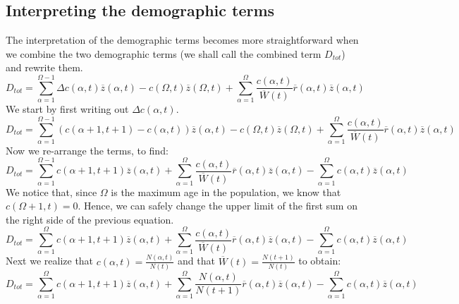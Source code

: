 \subsection{Interpreting the demographic terms}\label{app:ape:demo}
The interpretation of the demographic terms becomes more straightforward when we combine the two demographic terms (we shall call the combined term $D_{tot}$) and rewrite them.
\begin{equation}
D_{tot} =
\sum_{\alpha=1}^{\Omega-1} \Delta c(\alpha,t) \overline{z}(\alpha,t) - c(\Omega,t) \overline{z} (\Omega,t) + 
\sum_{\alpha=1}^\Omega 
	\frac{c(\alpha,t)}
    {\overline{W}(t)} 
\overline{r}(\alpha,t)
\overline{z}(\alpha,t)
\end{equation}
We start by first writing out $\Delta c(\alpha,t)$.
 \begin{equation}
D_{tot} =
\sum_{\alpha=1}^{\Omega-1} (c(\alpha+1,t+1) - c(\alpha,t)) \overline{z}(\alpha,t) - c(\Omega,t) \overline{z} (\Omega,t) + 
\sum_{\alpha=1}^\Omega 
	\frac{c(\alpha,t)}
    {\overline{W}(t)} 
\overline{r}(\alpha,t)
\overline{z}(\alpha,t)
\end{equation}
Now we re-arrange the terms, to find:
\begin{equation}
D_{tot} = \sum_{\alpha=1}^{\Omega-1} c(\alpha+1,t+1) \overline{z}(\alpha,t) + 
\sum_{\alpha=1}^\Omega 
	\frac{c(\alpha,t)}
    {\overline{W}(t)} 
\overline{r}(\alpha,t)
\overline{z}(\alpha,t)
- \sum_{\alpha=1}^{\Omega} c(\alpha,t) \overline{z}(\alpha,t)
\end{equation}
We notice that, since $\Omega$ is the maximum age in the population, we know that $c(\Omega + 1,t) = 0$. Hence, we can safely change the upper limit of the first sum on the right side of the previous equation.
\begin{equation}
D_{tot} = \sum_{\alpha=1}^{\Omega} c(\alpha+1,t+1) \overline{z}(\alpha,t) + 
\sum_{\alpha=1}^\Omega 
	\frac{c(\alpha,t)}
    {\overline{W}(t)} 
\overline{r}(\alpha,t)
\overline{z}(\alpha,t)
- \sum_{\alpha=1}^{\Omega} c(\alpha,t) \overline{z}(\alpha,t)
\end{equation}
Next we realize that $ c(\alpha,t) = \frac{N(\alpha,t)}{N(t)}$ and that $\overline{W}(t) = \frac{N(t+1)}{N(t)}$ to obtain:
\begin{equation}
D_{tot} = \sum_{\alpha=1}^{\Omega} c(\alpha+1,t+1) \overline{z}(\alpha,t) + 
\sum_{\alpha=1}^\Omega 
	\frac{N(\alpha,t)}
    {N(t+1)} 
\overline{r}(\alpha,t)
\overline{z}(\alpha,t)
- \sum_{\alpha=1}^{\Omega} c(\alpha,t) \overline{z}(\alpha,t)
\end{equation}
